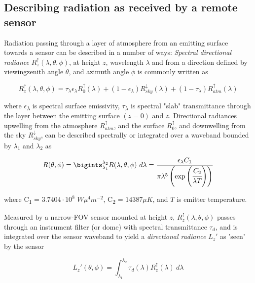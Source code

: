 \subsection{Describing radiation as received by a remote sensor}

Radiation passing through a layer of atmosphere from an emitting surface towards a sensor can be described in a number of ways: \textit{Spectral directional radiance} $R^\uparrow_z (\lambda, \theta, \phi)$, at height $ z $, wavelength $\lambda$ and from a direction defined by viewingzenith angle \(\theta\), and azimuth angle \(\phi\) is commonly written as

\begin{equation}
R^\uparrow_z (\lambda, \theta, \phi) = \tau_\lambda \epsilon_\lambda R^\uparrow_0(\lambda) + (1-\epsilon_\lambda) R^\downarrow_{sky} (\lambda) + (1-\tau_\lambda) R^\uparrow_{atm}(\lambda)
\end{equation}

\noindent where \(\epsilon\)\textsubscript{\( \lambda \)} is spectral surface emissivity, \(\tau\)\textsubscript{\( \lambda \)} is spectral "slab" transmittance through the layer between the emitting surface $( z  = 0) $ and $ z $. Directional radiances upwelling from the atmosphere $R^\uparrow_{atm}$, and the surface $R^\uparrow_0$, and downwelling from the sky $R^\downarrow_{sky}$, can be described spectrally or integrated over a waveband bounded by \(\lambda_1\) and \(\lambda_2\) as

\begin{equation}
R(\theta, \phi) = \bigints_{\lambda_1}^{\lambda_2} R(\lambda,\theta, \phi) ~ d\lambda =\displaystyle\frac{\epsilon_\lambda C_1}{\pi \lambda^5 \left( \exp\left(\cfrac{C_2}{\lambda T}\right)\right)}
\end{equation}

\noindent where C\textsubscript{1} = $ 3.7404 \cdot 10^8 $ $ W\mu^4 m^{-2} $, C\textsubscript{2} = $ 14387 \mu K $, and $T$ is emitter temperature.

Measured by a narrow-FOV sensor mounted at height $ z $, $R^\uparrow_z (\lambda, \theta, \phi)$ passes through an instrument filter (or dome) with spectral transmittance \(\tau_d\), and is integrated over the sensor waveband to yield a \textit{directional radiance} $L_z'$ as 'seen' by the sensor

\begin{equation}
L_z' (\theta, \phi) = \int_{\lambda_1}^{\lambda_2} \tau_d(\lambda) R^\uparrow_z(\lambda) ~ d\lambda
\end{equation}

